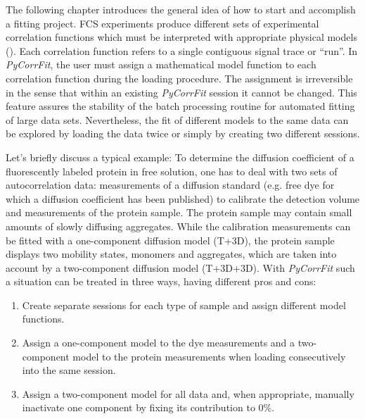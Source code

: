 The following chapter introduces the general idea of how to start and accomplish a fitting project. FCS experiments produce different sets of experimental correlation functions which must be interpreted with appropriate physical models (). Each correlation function refers to a single contiguous signal trace or ``run''. In \textit{PyCorrFit}, the user must assign a mathematical model function to each correlation function during the loading procedure. The assignment is irreversible in the sense that within an existing \textit{PyCorrFit} session it cannot be changed. This feature assures the stability of the batch processing routine for automated fitting of large data sets. Nevertheless, the fit of different models to the same data can be explored by loading the data twice or simply by creating two different sessions.

Let's briefly discuss a typical example: To determine the diffusion coefficient of a fluorescently labeled protein in free solution, one has to deal with two sets of autocorrelation data: measurements of a diffusion standard (e.g. free dye for which a diffusion coefficient has been published) to calibrate the detection volume and measurements of the protein sample. The protein sample may contain small amounts of slowly diffusing aggregates. While the calibration measurements can be fitted with a one-component diffusion model (T+3D), the protein sample displays two mobility states, monomers and aggregates, which are taken into account by a two-component diffusion model (T+3D+3D). With \textit{PyCorrFit} such a situation can be treated in three ways, having different pros and cons: 


\begin{enumerate}
\item Create separate sessions for each type of sample and assign different model functions.
\item Assign a one-component model to the dye measurements and a two-component model to the protein measurements when loading consecutively into the same session.
\item Assign a two-component model for all data and, when appropriate, manually inactivate one component by fixing its contribution to 0\%.
\end{enumerate}


